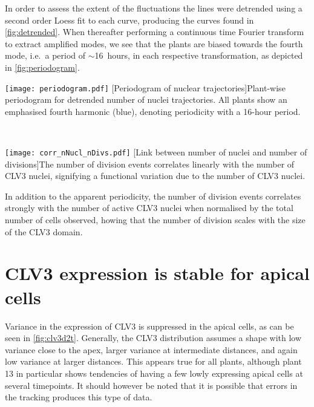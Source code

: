 In order to assess the extent of the fluctuations the lines were detrended using
a second order Loess fit to each curve, producing the curves found in
\cref{fig:detrended}. When thereafter performing a continuous time
Fourier transform to extract amplified modes, we see that the plants are
biased towards the fourth mode, i.e.\ a period of $\sim$16~hours, in each
respective transformation, as depicted in  
\cref{fig:periodogram}.
\vspace{2em}

\begin{minipage}{\textwidth}
  \begin{minipage}[t]{0.47\textwidth}
    \centering
  \texttt{[image: periodogram.pdf]}
    [Periodogram of nuclear trajectories]{Plant-wise periodogram for detrended number of nuclei
      trajectories. All plants show an emphasised fourth harmonic (blue),
      denoting periodicity with a 16-hour period.}
    \label{fig:periodogram}
  \end{minipage}~~
  \begin{minipage}[t]{.47\textwidth}
    \centering
    \texttt{[image: corr\_nNucl\_nDivs.pdf]}
    [Link between number of nuclei and number of divisions]{The number of division events correlates linearly
      with the number of CLV3 nuclei, signifying a functional variation due
      to the number of CLV3 nuclei.
    }
  \end{minipage}
\end{minipage}

\vspace{2em}
In addition to the apparent periodicity, the number of division events
correlates strongly with the number of active CLV3 nuclei when normalised by the
total number of cells observed, howing that the number of division scales with
the size of the CLV3 domain.


\section{CLV3 expression is stable for apical cells}
Variance in the expression of CLV3 is suppressed in the apical cells, as can be
seen in \cref{fig:clv3d2t}. Generally, the CLV3 distribution assumes a
shape with low variance close to the apex, larger variance at intermediate
distances, and again low variance at larger distances. 
This appears true for all plants, although plant
13 in particular shows tendencies of having a few lowly expressing apical cells at
several timepoints. It should however be noted that it is possible that errors
in the tracking produces this type of data. 

